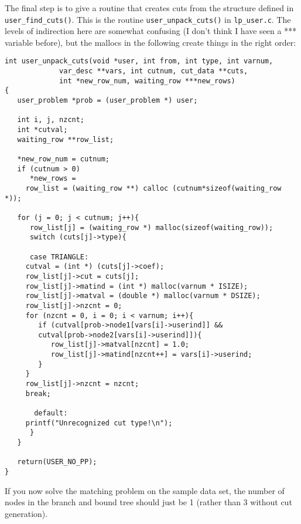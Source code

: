 \documentclass[11pt]{article}
\begin{document}
The final step is to give a routine that creates cuts from the structure
defined in \texttt{user\_find\_cuts()}. This is the routine
\texttt{user\_unpack\_cuts()} in \texttt{lp\_user.c}. The levels of
indirection here are somewhat confusing (I don't think I have seen a ***
variable before), but the mallocs in the following create things in the right
order:
\newpage
\begin{verbatim}
int user_unpack_cuts(void *user, int from, int type, int varnum,
		     var_desc **vars, int cutnum, cut_data **cuts,
		     int *new_row_num, waiting_row ***new_rows)
{
   user_problem *prob = (user_problem *) user;
   
   int i, j, nzcnt;
   int *cutval;
   waiting_row **row_list;
   
   *new_row_num = cutnum;
   if (cutnum > 0)
      *new_rows =
	 row_list = (waiting_row **) calloc (cutnum*sizeof(waiting_row *));
   
   for (j = 0; j < cutnum; j++){
      row_list[j] = (waiting_row *) malloc(sizeof(waiting_row));
      switch (cuts[j]->type){
	 
      case TRIANGLE:
	 cutval = (int *) (cuts[j]->coef);
	 row_list[j]->cut = cuts[j];
	 row_list[j]->matind = (int *) malloc(varnum * ISIZE);
	 row_list[j]->matval = (double *) malloc(varnum * DSIZE);
	 row_list[j]->nzcnt = 0;
	 for (nzcnt = 0, i = 0; i < varnum; i++){
	    if (cutval[prob->node1[vars[i]->userind]] &&
		cutval[prob->node2[vars[i]->userind]]){
	       row_list[j]->matval[nzcnt] = 1.0;
	       row_list[j]->matind[nzcnt++] = vars[i]->userind;
	    }
	 }
	 row_list[j]->nzcnt = nzcnt;
	 break;

       default:
	 printf("Unrecognized cut type!\n");
      }
   }
   
   return(USER_NO_PP);
}
\end{verbatim}

If you now solve the matching problem on the sample data set, the number of
nodes in the branch and bound tree should just be 1 (rather than 3 without cut
generation).
\end{document}
